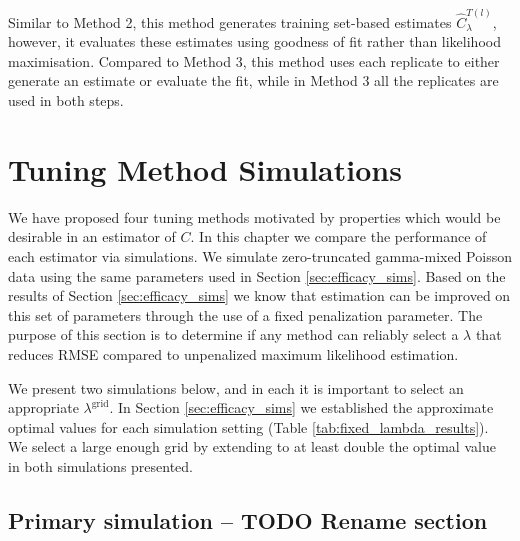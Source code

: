 \documentclass[12pt]{article}
\newcommand{\lambdagrid}{\lambda^{\text{grid}}}
\theoremstyle{break}
\theoremstyle{break}
\begin{document}
Similar to Method 2, this method generates training set-based estimates $\widehat{C}^{T(l)}_{\lambda}$, however, it evaluates these estimates using goodness of fit rather than likelihood maximisation.
Compared to Method 3, this method uses each replicate to either generate an estimate or evaluate the fit, while in Method 3 all the replicates are used in both steps.

\section{Tuning Method Simulations}
\label{sec:tuning_simulations}

We have proposed four tuning methods motivated by properties which would be desirable in an estimator of $C$.  In this chapter we compare the performance of each estimator via simulations.
We simulate zero-truncated gamma-mixed Poisson data using the same parameters used in Section \ref{sec:efficacy_sims}.
Based on the results of Section \ref{sec:efficacy_sims} we know that estimation can be improved on this set of parameters through the use of a fixed penalization parameter.  The purpose of this section is to determine if any method can reliably select a $\lambda$ that reduces RMSE compared to unpenalized maximum likelihood estimation.




We present two simulations below, and in each it is important to select an appropriate $\lambdagrid$.
In Section \ref{sec:efficacy_sims}  we established the approximate optimal values for each simulation setting (Table \ref{tab:fixed_lambda_results}).
We select a large enough grid by extending to at least double the optimal value in both simulations presented.

\subsection{Primary simulation -- TODO Rename section}
\label{sec:tuning_simulation_1}
\end{document}
